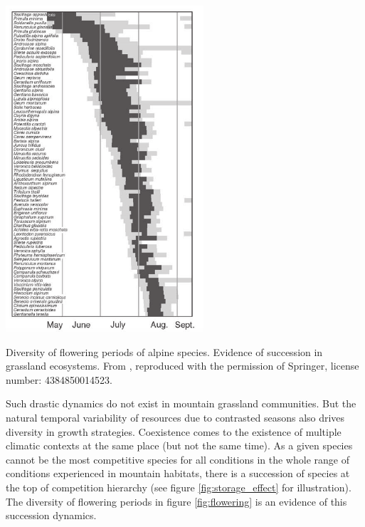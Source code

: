 \begin{marginfigure}
    \includegraphics{./1_Introduction/graphics/flowering_m.pdf}
  \caption[Flowering periods of alpine species]{Diversity of flowering periods of alpine species. Evidence of succession in grassland ecosystems. From \citet{korner_alpine_2003}, reproduced with the permission of Springer, license number: 4384850014523.}
  \label{fig:flowering}
\end{marginfigure}

Such drastic dynamics do not exist in mountain grassland communities. But the natural temporal variability of resources due to contrasted seasons also drives diversity in growth strategies. Coexistence comes to the existence of multiple climatic contexts at the same place (but not the same time). As a given species cannot be the most competitive species for all conditions in the whole range of conditions experienced in mountain habitats, there is a succession of species at the top of competition hierarchy \parencite{adler_climate_2006} (see figure \ref{fig:storage_effect} for illustration). The diversity of flowering periods in figure \ref{fig:flowering} is an evidence of this succession dynamics.

